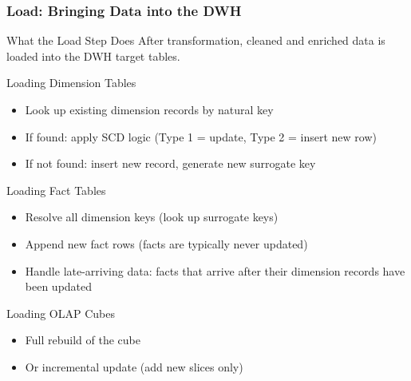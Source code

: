 \begin{frame}
  \frametitle{Load: Bringing Data into the DWH}

  \begin{block}{What the Load Step Does}
    After transformation, cleaned and enriched data is loaded into the
    DWH target tables.
  \end{block}

  \begin{block}{Loading Dimension Tables}
    \begin{itemize}
      \item Look up existing dimension records by natural key
      \item If found: apply SCD logic (Type 1 = update, Type 2 = insert new row)
      \item If not found: insert new record, generate new surrogate key
    \end{itemize}
  \end{block}

  \begin{block}{Loading Fact Tables}
    \begin{itemize}
      \item Resolve all dimension keys (look up surrogate keys)
      \item Append new fact rows (facts are typically never updated)
      \item Handle late-arriving data: facts that arrive after their
        dimension records have been updated
    \end{itemize}
  \end{block}

  \begin{block}{Loading OLAP Cubes}
    \begin{itemize}
      \item Full rebuild of the cube
      \item Or incremental update (add new slices only)
    \end{itemize}
  \end{block}
\end{frame}


